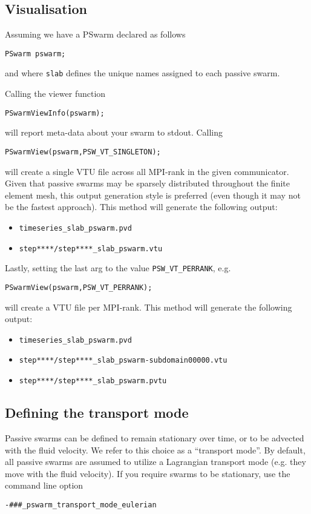 \documentclass[paper=a4, fontsize=10pt,twoside]{scrartcl}
\begin{document}
{{\subsection{Visualisation}

Assuming we have a PSwarm declared as follows
\begin{lstlisting}
PSwarm pswarm;
\end{lstlisting}
and where \texttt{slab} defines the unique names assigned to each passive swarm.

Calling the viewer function
\begin{lstlisting}
PSwarmViewInfo(pswarm);
\end{lstlisting}
will report meta-data about your swarm to stdout.
Calling
\begin{lstlisting}
PSwarmView(pswarm,PSW_VT_SINGLETON);
\end{lstlisting}
will create a single VTU file across all MPI-rank in the given communicator.
Given that passive swarms may be sparsely distributed throughout the finite element mesh,
this output generation style is preferred (even though it may not be the fastest approach).
This method will generate the following output:
\begin{itemize}
\item \texttt{timeseries\_slab\_pswarm.pvd}
\item \texttt{step****/step****\_slab\_pswarm.vtu}
\end{itemize}
Lastly, setting the last arg to the value \texttt{PSW\_VT\_PERRANK}, e.g.
\begin{lstlisting}
PSwarmView(pswarm,PSW_VT_PERRANK);
\end{lstlisting}
will create a VTU file per MPI-rank.
This method will generate the following output:
\begin{itemize}
\item \texttt{timeseries\_slab\_pswarm.pvd}
\item \texttt{step****/step****\_slab\_pswarm-subdomain00000.vtu}
\item \texttt{step****/step****\_slab\_pswarm.pvtu}
\end{itemize}




\subsection{Defining the transport mode}

Passive swarms can be defined to remain stationary over time, or to be advected with the fluid velocity.
We refer to this choice as a ``transport mode''. By default, all passive swarms are assumed to utilize a
Lagrangian transport mode (e.g. they move with the fluid velocity). If you require swarms to be stationary,
use the command line option
\begin{lstlisting}
-###_pswarm_transport_mode_eulerian
\end{lstlisting}

}}
\end{document}
